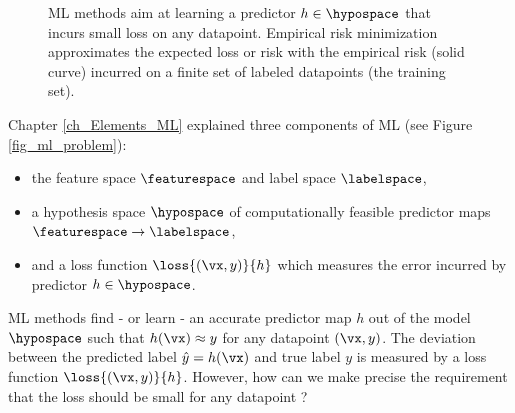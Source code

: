 \documentclass[12pt]{report}
\begin{document}
\begin{figure}[htbp]
\begin{center}
     \vspace*{-4mm}
\end{center}
\caption{ML methods aim at learning a predictor $h \in \hypospace$ that incurs 
	small loss on any datapoint. Empirical risk minimization approximates the
    expected loss or risk with the empirical risk (solid curve) incurred on a 
    finite set of labeled datapoints (the training set).}
\label{fig_ERM_idea}
\end{figure}


Chapter \ref{ch_Elements_ML} explained three components of ML (see Figure \ref{fig_ml_problem}): 
\begin{itemize} 
\item the feature space $\featurespace$ and label space $\labelspace$, 
\item a hypothesis space $\hypospace$ of computationally feasible predictor maps $\featurespace \rightarrow \labelspace$, 
\item and a loss function $\loss{(\vx,y)}{h}$ which measures the error incurred by predictor $h \in \hypospace$. 
\end{itemize} 
ML methods find - or learn - an accurate predictor map $h$ out 
of the model $\hypospace$ such that $h(\vx) \approx y$ for any 
datapoint $(\vx,y)$. The deviation between the predicted label $\hat{y}=h(\vx)$ 
and true label $y$ is measured by a loss function $\loss{(\vx,y)}{h}$. 
However, how can we make precise the requirement that the loss 
should be small for any datapoint ? 
\end{document}
